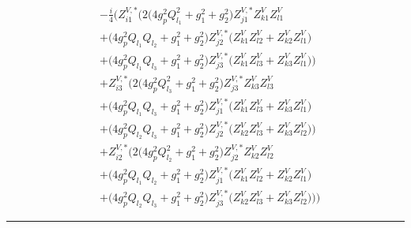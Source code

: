 \begin{align} 
 &-\frac{i}{4} \Big(Z^{V,*}_{i 1} \Big(2 \Big(4 g_{p}^{2} Q_{l_1}^{2}  + g_{1}^{2} + g_{2}^{2}\Big)Z^{V,*}_{j 1} Z_{{k 1}}^{V} Z_{{l 1}}^{V} \nonumber \\ 
 &+\Big(4 g_{p}^{2} Q_{l_1} Q_{l_2}  + g_{1}^{2} + g_{2}^{2}\Big)Z^{V,*}_{j 2} \Big(Z_{{k 1}}^{V} Z_{{l 2}}^{V}  + Z_{{k 2}}^{V} Z_{{l 1}}^{V} \Big)\nonumber \\ 
 &+\Big(4 g_{p}^{2} Q_{l_1} Q_{l_3}  + g_{1}^{2} + g_{2}^{2}\Big)Z^{V,*}_{j 3} \Big(Z_{{k 1}}^{V} Z_{{l 3}}^{V}  + Z_{{k 3}}^{V} Z_{{l 1}}^{V} \Big)\Big)\nonumber \\ 
 &+Z^{V,*}_{i 3} \Big(2 \Big(4 g_{p}^{2} Q_{l_3}^{2}  + g_{1}^{2} + g_{2}^{2}\Big)Z^{V,*}_{j 3} Z_{{k 3}}^{V} Z_{{l 3}}^{V} \nonumber \\ 
 &+\Big(4 g_{p}^{2} Q_{l_1} Q_{l_3}  + g_{1}^{2} + g_{2}^{2}\Big)Z^{V,*}_{j 1} \Big(Z_{{k 1}}^{V} Z_{{l 3}}^{V}  + Z_{{k 3}}^{V} Z_{{l 1}}^{V} \Big)\nonumber \\ 
 &+\Big(4 g_{p}^{2} Q_{l_2} Q_{l_3}  + g_{1}^{2} + g_{2}^{2}\Big)Z^{V,*}_{j 2} \Big(Z_{{k 2}}^{V} Z_{{l 3}}^{V}  + Z_{{k 3}}^{V} Z_{{l 2}}^{V} \Big)\Big)\nonumber \\ 
 &+Z^{V,*}_{i 2} \Big(2 \Big(4 g_{p}^{2} Q_{l_2}^{2}  + g_{1}^{2} + g_{2}^{2}\Big)Z^{V,*}_{j 2} Z_{{k 2}}^{V} Z_{{l 2}}^{V} \nonumber \\ 
 &+\Big(4 g_{p}^{2} Q_{l_1} Q_{l_2}  + g_{1}^{2} + g_{2}^{2}\Big)Z^{V,*}_{j 1} \Big(Z_{{k 1}}^{V} Z_{{l 2}}^{V}  + Z_{{k 2}}^{V} Z_{{l 1}}^{V} \Big)\nonumber \\ 
 &+\Big(4 g_{p}^{2} Q_{l_2} Q_{l_3}  + g_{1}^{2} + g_{2}^{2}\Big)Z^{V,*}_{j 3} \Big(Z_{{k 2}}^{V} Z_{{l 3}}^{V}  + Z_{{k 3}}^{V} Z_{{l 2}}^{V} \Big)\Big)\Big)\end{align} 
\hrule 
